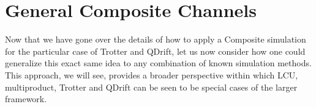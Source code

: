 
\section{General Composite Channels}
Now that we have gone over the details of how to apply a Composite simulation for the particular case of Trotter and QDrift, let us now consider how one could generalize this exact same idea to any combination of known simulation methods.  This approach, we will see, provides a broader perspective within which LCU, multiproduct, Trotter and QDrift can be seen to be special cases of the larger framework.

